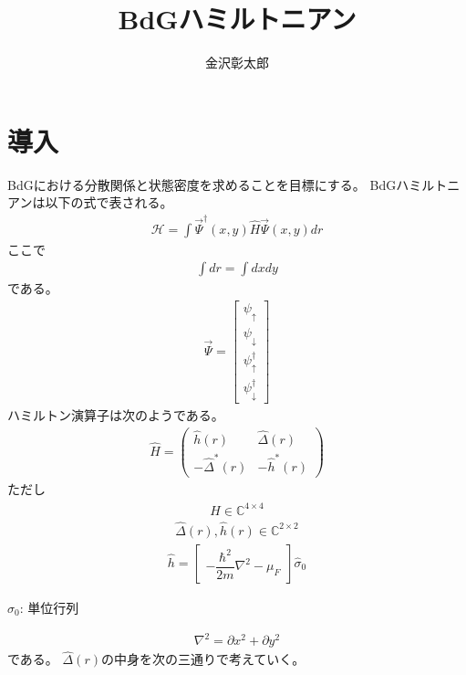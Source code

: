 \documentclass{jarticle}
\begin{document}
\title{BdGハミルトニアン}
\author{金沢彰太郎}
\maketitle

\tableofcontents
\newpage
\section{導入}
BdGにおける分散関係と状態密度を求めることを目標にする。
BdGハミルトニアンは以下の式で表される。
\begin{align}
\mathcal{H}=\int\vec{\Psi}^\dagger(x,y)\hat{H}\vec{\Psi}(x,y)dr
\end{align}
ここで
\begin{align}
\int{dr}=\int{dxdy}
\end{align}
である。
\begin{align}
\vec{\Psi}=\begin{bmatrix}
\psi_{\uparrow} \\
\psi_{\downarrow} \\
\psi_{\uparrow}^\dagger \\
\psi_{\downarrow}^\dagger
\end{bmatrix}
\end{align}
ハミルトン演算子は次のようである。
\begin{align}
\hat{H}=
\begin{pmatrix}
\hat{h}(r) & \hat{\Delta}(r) \\
-\hat{\Delta}^{*}(r) & -\hat{h}^{*}(r)
\end{pmatrix}
\end{align}
ただし
\begin{align}
\hat{H}\in\mathbb{C}^{4\times 4}
\end{align}
\begin{align}
\hat{\Delta}(r),\hat{h}(r)\in\mathbb{C}^{2\times 2}
\end{align}
\begin{align}
\hat{h}=
\begin{bmatrix}
-\dfrac{\hbar^2}{2m}\nabla^2-\mu_F
\end{bmatrix}
\hat{\sigma}_0
\end{align}
\begin{flushright}
	$\hat{\sigma}_0$: 単位行列
\end{flushright}
\begin{align}
\nabla^2=\partial x^2+\partial y^2		%
\end{align}
である。
$\hat{\Delta}(r)$の中身を次の三通りで考えていく。
\end{document}
